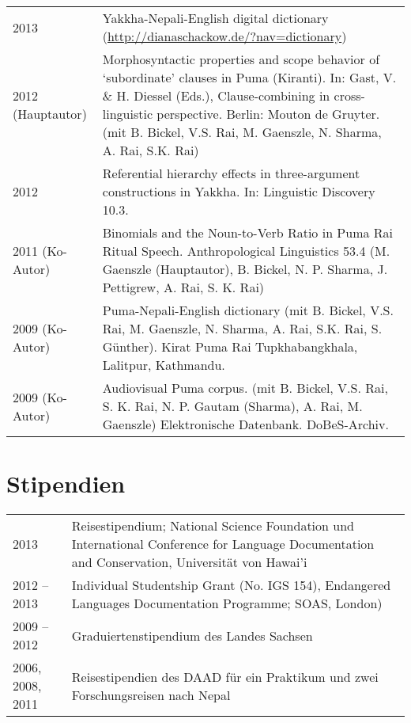 \begin{tabularx}{\textwidth}{@{}p{9em}X}
2013&				Yakkha-Nepali-English digital dictionary (\url{http://dianaschackow.de/?nav=dictionary}) \\
2012 (Hauptautor)&	Morphosyntactic properties and scope behavior of ‘subordinate’ clauses in Puma (Kiranti). In: Gast, V. \& H. Diessel (Eds.), Clause-combining in cross-linguistic perspective. Berlin: Mouton de Gruyter. (mit B. Bickel, V.S. Rai, M. Gaenszle, N. Sharma, A. Rai, S.K. Rai)\\
2012&				Referential hierarchy effects in three-argument constructions in Yakkha. In: Linguistic Discovery 10.3.\\
2011 (Ko-Autor)&Binomials and the Noun-to-Verb Ratio in Puma Rai Ritual Speech. Anthropological Linguistics 53.4 (M. Gaenszle (Hauptautor), B. Bickel, N. P. Sharma, J. Pettigrew, A. Rai, S. K. Rai)\\
2009 (Ko-Autor)&	Puma-Nepali-English dictionary
(mit B. Bickel, V.S. Rai, M. Gaenszle, N. Sharma, A. Rai, S.K. Rai, S. Günther). Kirat Puma Rai Tupkhabangkhala, Lalitpur, Kathmandu.\\
2009 (Ko-Autor)& Audiovisual Puma corpus. (mit B. Bickel, V.S. Rai, S. K. Rai, N. P. Gautam (Sharma), A. Rai, M. Gaenszle) Elektronische Datenbank. DoBeS-Archiv.\\
\end{tabularx}


\section*{Stipendien}

\begin{tabularx}{\textwidth}{@{}p{9em}X}
2013&			Reisestipendium; National Science Foundation und International Conference for Language Documentation and Conservation, Universität von Hawai'i\\
2012 – 2013&		Individual Studentship Grant (No. IGS 154), Endangered Languages Documentation Programme; SOAS, London)\\
2009 – 2012&		Graduiertenstipendium des Landes Sachsen\\
2006, 2008, 2011 & Reisestipendien des DAAD für ein Praktikum und zwei Forschungsreisen nach Nepal\\
\end{tabularx}

